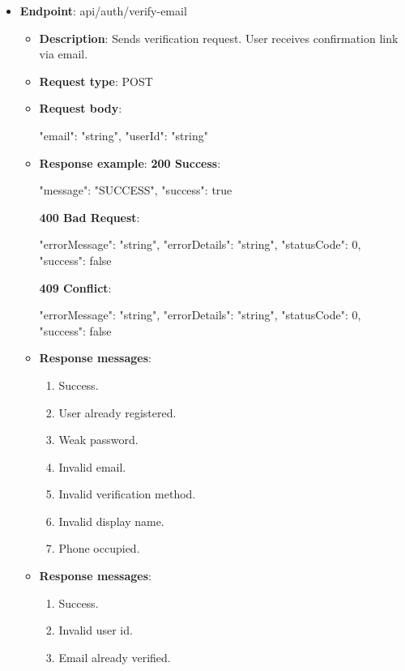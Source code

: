 \begin{itemize}
    \item \textbf{Endpoint}: api/auth/verify-email
    \begin{itemize}
        \item \textbf{Description}: Sends verification request.
        User receives confirmation link via email.
        \item \textbf{Request type}: POST
        \item \textbf{Request body}:
        \begin{spverbatim}
        {
            "email": "string",
            "userId": "string"
        }
        \end{spverbatim}
        \item  \textbf{Response example}:
        \textbf{200 Success}:
        \begin{spverbatim}
        {
            "message": "SUCCESS",
            "success": true
        }
        \end{spverbatim}
        \textbf{400 Bad Request}:
        \begin{spverbatim}
        {
            "errorMessage": "string",
            "errorDetails": "string",
            "statusCode": 0,
            "success": false
        }
        \end{spverbatim}
        \textbf{409 Conflict}:
        \begin{spverbatim}
        {
            "errorMessage": "string",
            "errorDetails": "string",
            "statusCode": 0,
            "success": false
        }
        \end{spverbatim}
        \item \textbf{Response messages}:
        \begin{enumerate}
            \item Success.
            \item User already registered.
            \item Weak password.
            \item Invalid email.
            \item Invalid verification method.
            \item Invalid display name.
            \item Phone occupied.
        \end{enumerate}
        \item \textbf{Response messages}:
        \begin{enumerate}
            \item Success.
            \item Invalid user id.
            \item Email already verified.
        \end{enumerate}
    \end{itemize}


\end{itemize}
